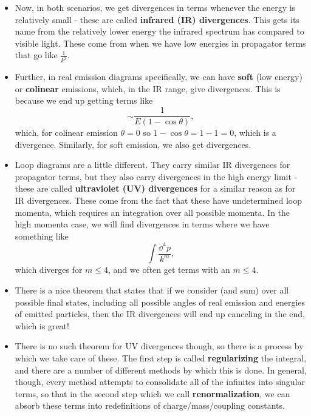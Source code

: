 \begin{itemize}
    \item Now, in both scenarios, we get divergences in terms whenever the energy is relatively small - these are called \textbf{infrared (IR) divergences}. This gets its name from the relatively lower energy the infrared spectrum has compared to visible light. These come from when we have low energies in propagator terms that go like $\frac{1}{k^2}$.
    \item Further, in real emission diagrams specifically, we can have \textbf{soft} (low energy) or \textbf{colinear} emissions, which, in the IR range, give divergences. This is because we end up getting terms like
        \begin{equation*}
            \sim \frac{1}{E(1-\cos\theta)},
        \end{equation*}
        which, for colinear emission $\theta=0$ so $1-\cos\theta=1-1=0$, which is a divergence. Similarly, for soft emission, we also get divergences.
    \item Loop diagrams are a little different. They carry similar IR divergences for propagator terms, but they also carry divergences in the high energy limit - these are called \textbf{ultraviolet (UV) divergences} for a similar reason as for IR divergences. These come from the fact that these have undetermined loop momenta, which requires an integration over all possible momenta. In the high momenta case, we will find divergences in terms where we have something like
        \begin{equation*}
            \int\frac{\dd^4p}{k^m},
        \end{equation*}
        which diverges for $m\leq4$, and we often get terms with an $m\leq4$.
    \item There is a nice theorem that states that if we consider (and sum) over all possible final states, including all possible angles of real emission and energies of emitted particles, then the IR divergences will end up canceling in the end, which is great!
    \item There is no such theorem for UV divergences though, so there is a process by which we take care of these. The first step is called \textbf{regularizing} the integral, and there are a number of different methods by which this is done. In general, though, every method attempts to consolidate all of the infinites into singular terms, so that in the second step which we call \textbf{renormalization}, we can absorb these terms into redefinitions of charge/mass/coupling constants.

\end{itemize}
